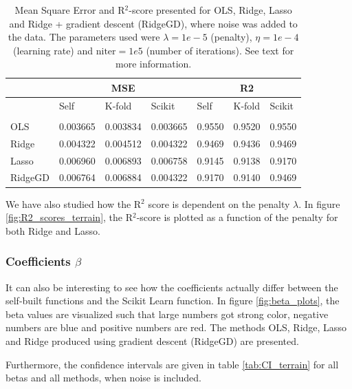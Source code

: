 \begin{table} [H]
	\caption{Mean Square Error and R$^2$-score presented for OLS, Ridge, Lasso and Ridge + gradient descent (RidgeGD), where noise was added to the data. The parameters used were $\lambda=1e-5$ (penalty), $\eta=1e-4$ (learning rate) and $\text{niter}=1e5$ (number of iterations). See text for more information.}
	\begin{tabularx}{\textwidth}{l|XXX|XXX} \hline\hline
		\label{tab:terrain_error}
		& \multicolumn{3}{c}{\textbf{MSE}}&\multicolumn{3}{c}{\textbf{R2}}\\ \hline
		&Self&K-fold&Scikit&Self&K-fold&Scikit\\ \hline \\
		OLS & 0.003665 & 0.003834 & 0.003665 & 0.9550 & 0.9520 & 0.9550\\
		Ridge & 0.004322 & 0.004512 & 0.004322 & 0.9469 & 0.9436 & 0.9469 \\
		Lasso & 0.006960 & 0.006893 & 0.006758 & 0.9145 & 0.9138 & 0.9170 \\
		RidgeGD & 0.006764 & 0.006884 & 0.004322 & 0.9170 & 0.9140 & 0.9469 \\ \hline
	\end{tabularx}
\end{table}

We have also studied how the R$^2$ score is dependent on the penalty $\lambda$. In figure \eqref{fig:R2_scores_terrain}, the R$^2$-score is plotted as a function of the penalty for both Ridge and Lasso.


\iffalse
\subsubsection{Coefficients $\beta$}
It can also be interesting to see how the coefficients actually differ between the self-built functions and the Scikit Learn function. In figure \eqref{fig:beta_plots}, the beta values are visualized such that large numbers got strong color, negative numbers are blue and positive numbers are red. The methods OLS, Ridge, Lasso and Ridge produced using gradient descent (RidgeGD) are presented. 

Furthermore, the confidence intervals are given in table \eqref{tab:CI_terrain} for all betas and all methods, when noise is included.

